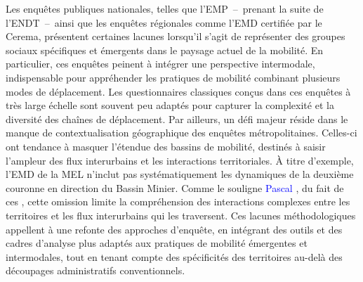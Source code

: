 \begin{refsegment}
Les enquêtes publiques nationales, telles que l'\acrfull{EMP}~–~prenant la suite de l'\acrfull{ENDT}~–~ainsi que les enquêtes régionales comme l'\acrfull{EMD} certifiée par le \acrshort{Cerema}, présentent certaines lacunes lorsqu’il s’agit de représenter des groupes sociaux spécifiques et émergents dans le paysage actuel de la mobilité. En particulier, ces enquêtes peinent à intégrer une perspective intermodale, indispensable pour appréhender les pratiques de mobilité combinant plusieurs modes de déplacement. Les questionnaires classiques conçus dans ces enquêtes à très large échelle sont souvent peu adaptés pour capturer la complexité et la diversité des chaînes de déplacement. Par ailleurs, un défi majeur réside dans le manque de contextualisation géographique des enquêtes métropolitaines. Celles-ci ont tendance à masquer l'étendue des bassins de mobilité, destinés à saisir l'ampleur des flux interurbains et les interactions territoriales. À titre d’exemple, l'\acrshort{EMD} de la \acrshort{MEL} n’inclut pas systématiquement les dynamiques de la deuxième couronne en direction du Bassin Minier. Comme le souligne \textcolor{blue}{Pascal} \textcolor{blue}{\textcite[29-30]{gabet_etude_2004}}, du fait de ces , cette omission limite la compréhension des interactions complexes entre les territoires et les flux interurbains qui les traversent. Ces lacunes méthodologiques appellent à une refonte des approches d’enquête, en intégrant des outils et des cadres d’analyse plus adaptés aux pratiques de mobilité émergentes et intermodales, tout en tenant compte des spécificités des territoires au-delà des découpages administratifs conventionnels.%


\end{refsegment}
